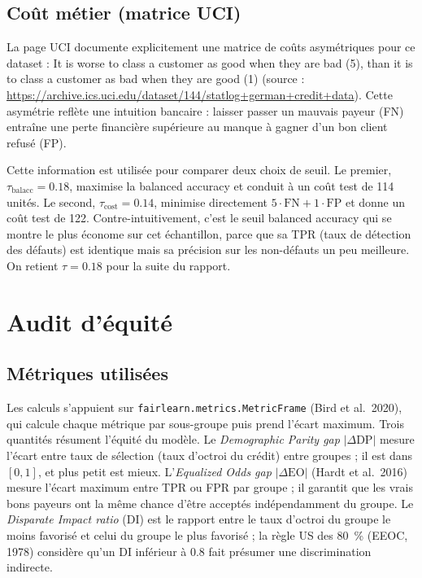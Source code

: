 \documentclass[11pt, a4paper]{article}
\begin{document}
\subsection{Coût métier (matrice UCI)}

La page UCI documente explicitement une matrice de coûts asymétriques pour ce dataset : \og{} It is worse to class a customer as good when they are bad (5), than it is to class a customer as bad when they are good (1) \fg{} (source : \url{https://archive.ics.uci.edu/dataset/144/statlog+german+credit+data}). Cette asymétrie reflète une intuition bancaire : laisser passer un mauvais payeur (FN) entraîne une perte financière supérieure au manque à gagner d'un bon client refusé (FP).

Cette information est utilisée pour comparer deux choix de seuil. Le premier, $\tau_{\text{balacc}} = 0.18$, maximise la balanced accuracy et conduit à un coût test de 114 unités. Le second, $\tau_{\text{cost}} = 0.14$, minimise directement $5 \cdot \text{FN} + 1 \cdot \text{FP}$ et donne un coût test de 122. Contre-intuitivement, c'est le seuil balanced accuracy qui se montre le plus économe sur cet échantillon, parce que sa TPR (taux de détection des défauts) est identique mais sa précision sur les non-défauts un peu meilleure. On retient $\tau = 0.18$ pour la suite du rapport.

\section{Audit d'équité}

\subsection{Métriques utilisées}

Les calculs s'appuient sur \texttt{fairlearn.metrics.MetricFrame} (Bird et al.\ 2020), qui calcule chaque métrique par sous-groupe puis prend l'écart maximum. Trois quantités résument l'équité du modèle. Le \emph{Demographic Parity gap} $|\Delta\text{DP}|$ mesure l'écart entre taux de sélection (taux d'octroi du crédit) entre groupes ; il est dans $[0, 1]$, et plus petit est mieux. L'\emph{Equalized Odds gap} $|\Delta\text{EO}|$ (Hardt et al.\ 2016) mesure l'écart maximum entre TPR ou FPR par groupe ; il garantit que les vrais bons payeurs ont la même chance d'être acceptés indépendamment du groupe. Le \emph{Disparate Impact ratio} (DI) est le rapport entre le taux d'octroi du groupe le moins favorisé et celui du groupe le plus favorisé ; la règle US des 80~\% (EEOC, 1978) considère qu'un DI inférieur à 0.8 fait présumer une discrimination indirecte.
\end{document}

